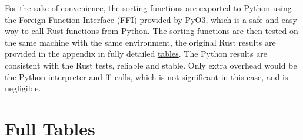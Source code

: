 \documentclass{article}
\begin{document}
For the sake of convenience, the sorting functions are exported to Python using the Foreign Function Interface (FFI) provided by PyO3, which is a safe and easy way to call Rust functions from Python.
The sorting functions are then tested on the same machine with the same environment, the original Rust results are provided in the appendix in fully detailed \hyperlink{FullTables}{tables}. The Python results are consistent with the Rust tests, reliable and stable.
Only extra overhead would be the Python interpreter and ffi calls, which is not significant in this case, and is negligible.

\section{Full Tables}
\hypertarget{FullTables}{}
\end{document}
